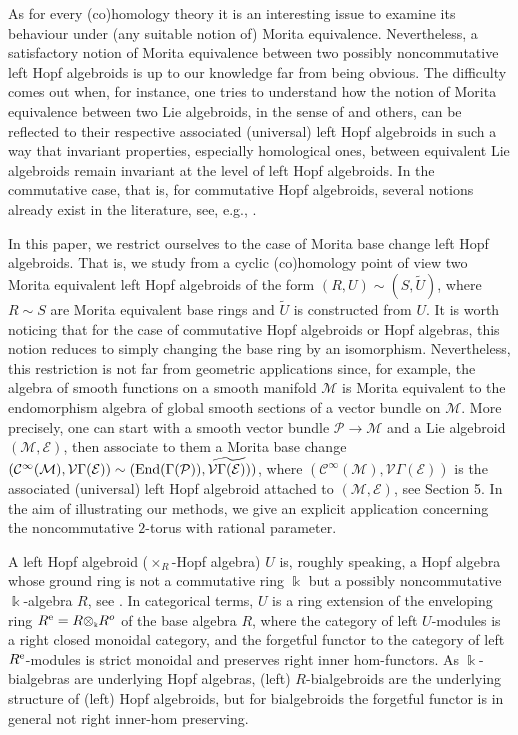 \documentclass[reqno, a4paper, 10pt]{amsart}
\numberwithin{equation}{section}
\theoremstyle{plain}
\theoremstyle{definition}
\theoremstyle{remark}
\begin{document}
As for every (co)homology theory it is an interesting issue to examine its behaviour under (any suitable notion of) Morita equivalence.  Nevertheless, a satisfactory notion of  Morita equivalence between two possibly noncommutative left Hopf algebroids is up to our knowledge  far from being obvious. The difficulty comes out when, for instance, one tries to understand how the notion of Morita equivalence between two Lie algebroids, in the sense of  \cite{Cra:DAACVEIACC, Gin:GGOPVB} and others, can be reflected  to their respective associated (universal) left Hopf algebroids in such a way that invariant properties, especially homological ones, between equivalent Lie algebroids remain invariant at the level of left Hopf algebroids. 
In the commutative case, that is, for  commutative Hopf algebroids, several notions already  exist in the literature, see, e.g., \cite{Hovey:02, Hovey/Strickland:05}.

In this paper, we restrict ourselves to the case of Morita base change left Hopf algebroids. That is, we  study from a cyclic (co)homology point of view two Morita equivalent left Hopf algebroids of the form $(R,U) \sim (S,\tilde{U})$, where $R  \sim S$ are Morita equivalent base rings and $\tilde{U}$ is constructed from $U$. It is worth noticing that for the  case  of commutative Hopf algebroids or Hopf algebras,  this notion reduces to simply changing the base ring by an isomorphism. 
Nevertheless, this restriction is not far from geometric applications since, for example, the algebra of smooth functions on a smooth manifold ${{\mathcal M}}$ is Morita equivalent to the endomorphism algebra of global smooth sections of a vector bundle on ${{\mathcal M}}$. 
More precisely, one can start with a smooth vector bundle ${{\mathcal P}} \to {{\mathcal M}}$ and a Lie algebroid $({{\mathcal M}}, {{\mathcal E}})$, then associate to them a Morita base change $({{\mathcal C}}^{\infty}({{\mathcal M}}),{{\mathcal V}}\Gamma({{\mathcal E}})) \sim ({\rm End}(\Gamma({{\mathcal P}})), \widetilde{{{\mathcal V}}\Gamma({{\mathcal E}}))})$, where   $({{\mathcal C}}^{\infty}({{\mathcal M}})
 ,{{\mathcal V}}\Gamma({{\mathcal E}}))$ is the associated (universal) left Hopf algebroid attached to $({{\mathcal M}}, {{\mathcal E}})$, see Section 5. In the aim of illustrating our methods, we give an explicit application concerning the noncommutative $2$-torus {with rational parameter}. 

A left Hopf algebroid ($\times_R$-Hopf algebra) $U$ is, roughly speaking, a Hopf algebra whose ground ring is not
a commutative ring ${{\Bbbk}}$ but a possibly noncommutative ${{\Bbbk}}$-algebra $R$, see \cite{Boe:HA,Schau:DADOQGHA, Tak:GOAOAA}. In categorical terms, $U$ is a ring extension of the enveloping ring ${{R^{\rm e}}}=R{\otimes_{\scriptscriptstyle{{\Bbbk}}}}R^{o}$ of the base algebra $R$, where the category of left $U$-modules is a right closed monoidal category, and the forgetful functor to the category of left ${{R^{\rm e}}}$-modules is strict monoidal and preserves right inner hom-functors.
As ${{\Bbbk}}$-bialgebras are underlying Hopf algebras, (left) $R$-bialgebroids are the underlying structure of (left) Hopf algebroids, but for bialgebroids the forgetful functor is in general not right inner-hom preserving. 
\end{document}
